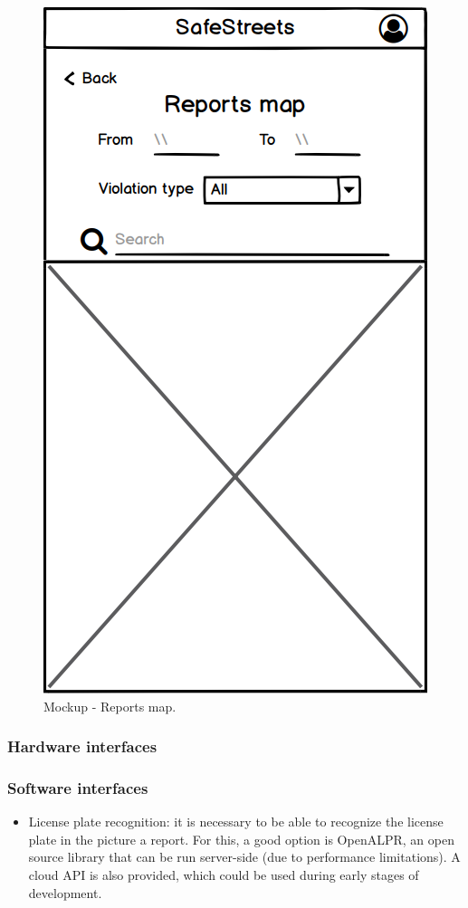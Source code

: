 \begin{figure}[H]
\begin{minipage}{.4\textwidth}
    \includegraphics[width=.8\textwidth]{Images/reports-map.png}
    \caption{\label{fig:mockup-reports-map}Mockup - Reports map.}
\end{minipage}
\end{figure}

\subsubsection{Hardware interfaces}
\subsubsection{Software interfaces}
\begin{itemize}
\item
License plate recognition: it is necessary to be able to recognize the license plate in the picture a report. For this, a good option is OpenALPR, an open source library that can be run server-side (due to performance limitations). A cloud API is also provided, which could be used during early stages of development.
\end{itemize}
